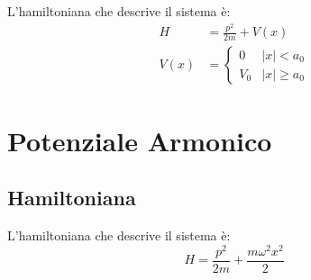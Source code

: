 \documentclass[a4paper]{scrreport}
\begin{document}
L'hamiltoniana che descrive il sistema è:
\begin{align}
    H  &= \frac{p^ 2}{2m} + V(x)\\
    V(x) &=
    \begin{cases}
        0 & |x|< a_0\\
        V_0 & |x|\ge a_0
    \end{cases}
\end{align}

\section{Potenziale Armonico}

\subsection{Hamiltoniana}

L'hamiltoniana che descrive il sistema è:
\begin{equation}
    H = \frac{ p^ 2}{2m} + \frac{m\omega ^ 2 x ^ 2}{2}
\end{equation}
\end{document}
